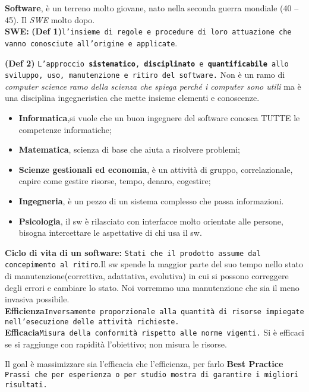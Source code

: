 \textbf{Software}, è un terreno molto giovane, nato nella seconda guerra mondiale (40 – 45). Il \textit{SWE} molto dopo.\\
\textbf{SWE:} \textbf{(Def 1)}\texttt{l'insieme di regole e procedure di loro attuazione che vanno conosciute all'origine e applicate}.\\
{\textbf{(Def 2)} \texttt{L'approccio \textbf{sistematico}, \textbf{disciplinato} e \textbf{quantificabile} allo sviluppo, uso, manutenzione e ritiro del software.} Non è un ramo di \textit{computer science} \textit{ramo della scienza che spiega perché i computer sono utili} ma è una disciplina ingegneristica che mette insieme elementi e conoscenze.

\begin{itemize}

	\item \textbf{Informatica},si vuole che un buon ingegnere del software conosca TUTTE le competenze informatiche;
	\item \textbf{Matematica}, scienza di base che aiuta a risolvere problemi;
	\item \textbf{Scienze gestionali ed economia}, è un attività di gruppo, correlazionale, capire come gestire risorse, tempo, denaro, cogestire;
	\item \textbf{Ingegneria}, è un pezzo di un sistema complesso che passa informazioni.
	\item \textbf{Psicologia}, il sw è rilasciato con interfacce molto orientate alle persone, bisogna intercettare le aspettative di chi usa il sw.

\end{itemize}

\textbf{Ciclo di vita di un software:} \texttt{Stati che il prodotto assume dal concepimento al ritiro}.Il sw spende la maggior parte del suo tempo nello stato di manutenzione(correttiva, adattativa, evolutiva) in cui si possono correggere degli errori e cambiare lo stato. Noi vorremmo una manutenzione che sia il meno invasiva possibile.\\

\textbf{Efficienza}\texttt{Inversamente proporzionale alla quantità di risorse impiegate nell'esecuzione delle attività richieste.}	\\

\textbf{Efficacia}\texttt{Misura della conformità rispetto alle norme vigenti.} Si è efficaci se si raggiunge con rapidità l'obiettivo; non misura le risorse.

Il goal è massimizzare sia l'efficacia che l'efficienza, per farlo
\textbf{Best Practice }\\
\texttt{Prassi che per esperienza o per studio mostra di garantire i migliori risultati.}\\

}
